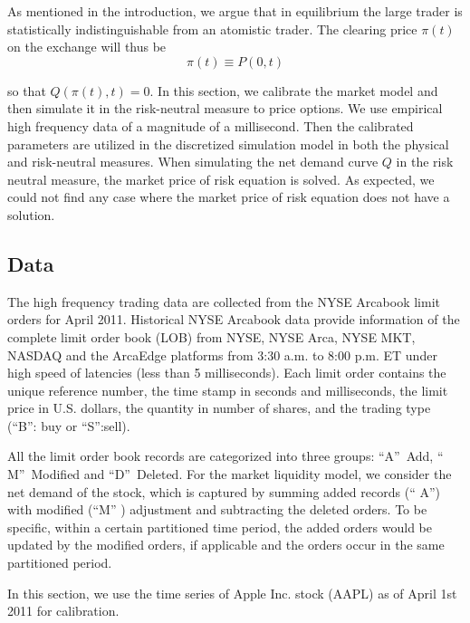 \documentclass{article}
\begin{document}
As mentioned in the introduction, we argue that in equilibrium the large
trader is statistically indistinguishable from an atomistic trader. The
clearing price $\pi (t)$ on the exchange will thus be%
\[
\pi (t)\equiv P(0,t)
\]

so that $Q(\pi (t),t)=0$. In this section, we calibrate the market model and
then simulate it in the risk-neutral measure to price options. We use
empirical high frequency data of a magnitude of a millisecond. Then the
calibrated parameters are utilized in the discretized simulation model in
both the physical and risk-neutral measures. When simulating the net demand
curve $Q$ in the risk neutral measure, the market price of risk equation is
solved. As expected, we could not find any case where the market price of
risk equation does not have a solution.

\subsection{Data}

The high frequency trading data are collected from the NYSE Arcabook limit
orders for April 2011. Historical NYSE Arcabook data provide information of
the complete limit order book (LOB) from NYSE, NYSE Arca, NYSE MKT, NASDAQ
and the ArcaEdge platforms from 3:30 a.m. to 8:00 p.m. ET under high speed
of latencies (less than 5 milliseconds). Each limit order contains the
unique reference number, the time stamp in seconds and milliseconds, the
limit price in U.S. dollars, the quantity in number of shares, and the
trading type (\textquotedblleft B\textquotedblright : buy or
\textquotedblleft S\textquotedblright :sell).

All the limit order book records are categorized into three groups:
\textquotedblleft A\textquotedblright\ Add, \textquotedblleft
M\textquotedblright\ Modified and \textquotedblleft D\textquotedblright\
Deleted. For the market liquidity model, we consider the net demand of the
stock, which is captured by summing added records (\textquotedblleft
A\textquotedblright ) with modified (\textquotedblleft M\textquotedblright
) adjustment and subtracting the deleted orders. To be specific, within a
certain partitioned time period, the added orders would be updated by the
modified orders, if applicable and the orders occur in the same partitioned
period.

In this section, we use the time series  of Apple Inc. stock (AAPL) as of
April 1st 2011 for calibration.

\bigskip
\end{document}

